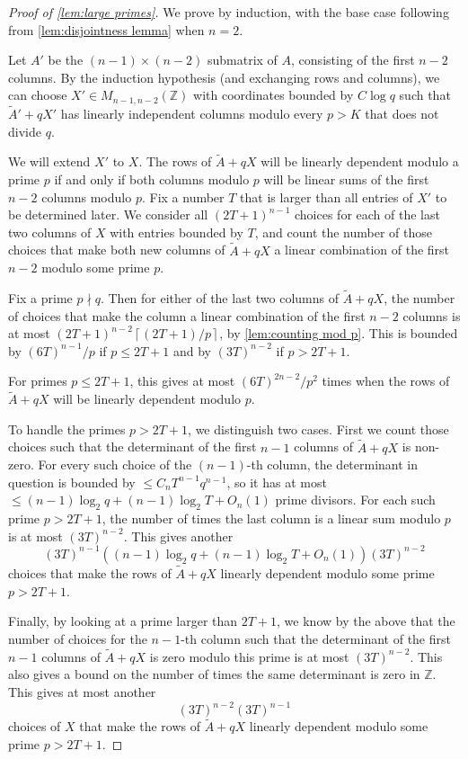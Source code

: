 \documentclass[12pt, a4paper]{amsart}
\numberwithin{equation}{section}
\theoremstyle{definition}
\newcommand{\Z}{\mathbb{Z}}
\newcommand{\wt}{\widetilde}
\begin{document}
\begin{proof}[Proof of \cref{lem:large primes}]
We prove by induction, with the base case following from \cref{lem:disjointness lemma} when $n=2$.

Let $A'$ be the $(n-1)\times(n-2)$ submatrix of $A$, consisting of the first $n-2$ columns. By the induction hypothesis (and exchanging rows and columns), we can choose $X'\in M_{n-1,n-2}(\Z)$ with coordinates bounded by $C\log q$
such that $\wt A'+qX'$ has linearly independent columns modulo every $p>K$ that does not divide $q$. 

We will extend $X'$ to $X$.
The rows of $\wt A+qX$ will be linearly dependent modulo a prime $p$ if and only if both columns modulo $p$ will be linear sums of the first $n-2$ columns modulo $p$.
Fix a number $T$ that is larger than all entries of $X'$ to be determined later.
We consider all $(2T+1)^{n-1}$ choices for each of the last two columns of $X$
with entries bounded by $T$, and count the number of those choices that make
both new columns of $\wt A+qX$ a linear combination of the first $n-2$ modulo some prime $p$.  

Fix a prime $p\nmid q$.
Then for either of the last two columns of $\wt A+qX$,
the number of choices that make the column
a linear combination of the first $n-2$ columns
is at most $(2T+1)^{n-2}\left\lceil(2T+1)/p\right\rceil$,
by \cref{lem:counting mod p}.
This is bounded by $(6T)^{n-1}/p$ if $p\le 2T+1$ and by $(3T)^{n-2}$ if $p>2T+1$.


For primes $p\le 2T+1$, this gives at most $(6T)^{2n-2}/p^2$ times when the rows of $\wt A+qX$ will be linearly dependent modulo $p$.

To handle the primes $p>2T+1$, we distinguish two cases.
First we count those choices such that the determinant of the first
$n-1$ columns of $\wt A+qX$ is non-zero.
For every such choice of the $(n-1)$-th column, the determinant in question is bounded by
$\le C_{n}T^{n-1}q^{n-1}$, so it has at most $\le(n-1)\log_2 q+(n-1)\log_2 T+O_{n}(1)$
prime divisors. For each such prime $p>2T+1$, the number of times the last column is a linear sum modulo $p$ is at most $(3T)^{n-2}$. This gives another
\[
(3T)^{n-1}((n-1)\log_2 q+(n-1)\log_2 T+O_{n}(1))(3T)^{n-2}
\]
choices that make the rows of $\wt A+qX$ linearly dependent modulo some prime $p>2T+1$. 

Finally, by looking at a prime larger than $2T+1$, we know by the above
that the number of choices for the $n-1$-th column such that the determinant of the first $n-1$ columns of $\wt A+qX$ is zero modulo this prime is at most $(3T)^{n-2}$.
This also gives a bound on the number of times the same determinant is zero in $\Z$.
This gives at most another 
\[
(3T)^{n-2}(3T)^{n-1}
\]
choices of $X$ that make the rows of $\wt A+qX$ linearly dependent modulo some prime $p>2T+1$. 


\end{proof}
\end{document}
